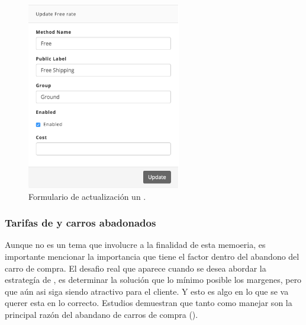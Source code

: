 \begin{figure}[H]
	\centering
	\includegraphics[width=0.6\textwidth]{figuras/dashboard/shipping/form_shipping_update.png}
	\caption{Formulario de actualización un \shippingEF.}
	\label{figure:dashboard:shipping:form_shipping_update}
\end{figure}


\subsubsection{Tarifas de \shippingEF y carros abadonados}

Aunque no es un tema que involucre a la finalidad de esta memoeria, es importante mencionar la importancia que tiene el factor \shippingEF dentro del abandono del carro de compra.
El desafio real que aparece cuando se desea abordar la estrategía de \shippingEF, es determinar la solución que lo mínimo posible los margenes, pero que aún asi siga siendo atractivo para el cliente.
Y esto es algo en lo que se va querer esta en lo correcto. Estudios demuestran que  tanto \shippingEF como manejar son la principal razón del abandano de carros de compra ()\cite{online_forrester_consulting_smarter_stratefie_free_shipping}.


